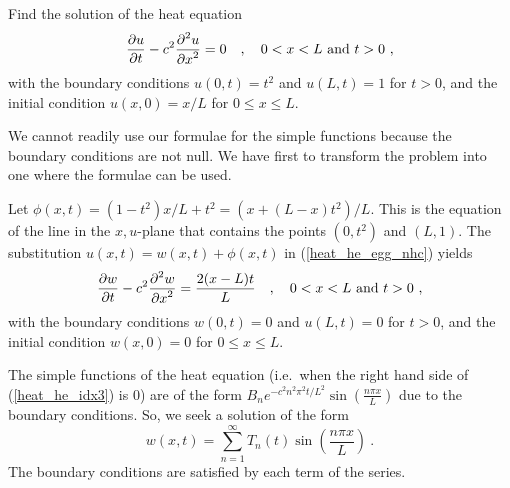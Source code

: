 \begin{egg}
Find the solution of the heat equation
\begin{equation} \label{heat_he_egg_nhc}
\frac{\partial{u}}{\partial t} - c^2 \frac{\displaystyle \partial^{2}{u}} {\displaystyle \partial x^{2}} = 0 \quad , \quad 0 < x < L
  \ \text{and} \ t > 0 \ ,
\end{equation}
with the boundary conditions $u(0,t) = t^2$ and $u(L,t) = 1$ for
$t>0$, and the initial condition $\displaystyle u(x,0) = x/L$
for $0 \leq x \leq L$.

We cannot readily use our formulae for the simple functions because
the boundary conditions are not null.  We have first to transform the
problem into one where the formulae can be used.

Let $\phi(x,t) = (1-t^2)x/L + t^2 = (x+(L-x)t^2)/L$.
This is the equation of the line in the $x,u$-plane that contains the
points $(0,t^2)$ and $(L,1)$.  The substitution
$u(x,t) = w(x,t) + \phi(x,t)$ in (\ref{heat_he_egg_nhc}) yields
\begin{equation} \label{heat_he_idx3}
\frac{\partial{w}}{\partial t} - c^2 \frac{\displaystyle \partial^{2}{w}} {\displaystyle \partial x^{2}} = \frac{2(x-L)t}{L} \quad ,
\quad 0 < x < L \ \text{and} \ t>0 \ ,
\end{equation}
with the boundary conditions
$w(0,t) = 0$ and $u(L,t) = 0$ for $t>0$, and the initial condition
$w(x,0) = 0$ for $0 \leq x \leq L$.

The simple functions of the heat equation
(i.e.\ when the right hand side of (\ref{heat_he_idx3}) is $0$) are of
the form
$\displaystyle B_n e^{-c^2n^2\pi^2t/L^2} \sin\left(\frac{n\pi x}{L}\right)$
due to the boundary conditions.  So, we seek a solution of the form
\begin{equation} \label{heat_he_idx1}
w(x,t) = \sum_{n=1}^\infty T_n(t) \sin\left(\frac{n\pi x}{L}\right) \ .
\end{equation}
The boundary conditions are satisfied by each term of the series.


\end{egg}
